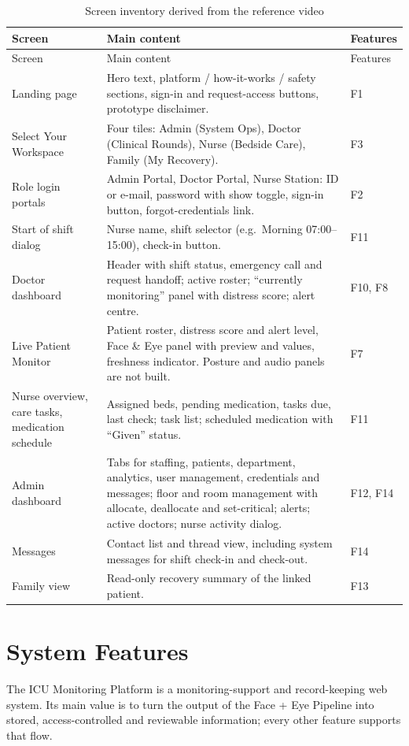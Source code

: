 \documentclass[a4paper,11pt]{scrreprt}
\begin{document}
\begin{longtable}{@{}>{\raggedright\arraybackslash}p{4.3cm}>{\raggedright\arraybackslash}p{8.2cm}>{\raggedright\arraybackslash}p{2.5cm}@{}}
\caption{Screen inventory derived from the reference video}\label{tab:screens}\\
\toprule Screen & Main content & Features\\ \midrule \endfirsthead
\toprule Screen & Main content & Features\\ \midrule \endhead
\bottomrule \endfoot
Landing page & Hero text, platform / how-it-works / safety sections, sign-in and request-access buttons, prototype disclaimer. & F1\\ \midrule
Select Your Workspace & Four tiles: Admin (System Ops), Doctor (Clinical Rounds), Nurse (Bedside Care), Family (My Recovery). & F3\\ \midrule
Role login portals & Admin Portal, Doctor Portal, Nurse Station: ID or e-mail, password with show toggle, sign-in button, forgot-credentials link. & F2\\ \midrule
Start of shift dialog & Nurse name, shift selector (e.g.\ Morning 07:00--15:00), check-in button. & F11\\ \midrule
Doctor dashboard & Header with shift status, emergency call and request handoff; active roster; ``currently monitoring'' panel with distress score; alert centre. & F10, F8\\ \midrule
Live Patient Monitor & Patient roster, distress score and alert level, Face \& Eye panel with preview and values, freshness indicator. Posture and audio panels are not built. & F7\\ \midrule
Nurse overview, care tasks, medication schedule & Assigned beds, pending medication, tasks due, last check; task list; scheduled medication with ``Given'' status. & F11\\ \midrule
Admin dashboard & Tabs for staffing, patients, department, analytics, user management, credentials and messages; floor and room management with allocate, deallocate and set-critical; alerts; active doctors; nurse activity dialog. & F12, F14\\ \midrule
Messages & Contact list and thread view, including system messages for shift check-in and check-out. & F14\\ \midrule
Family view & Read-only recovery summary of the linked patient. & F13\\
\end{longtable}

\chapter{System Features}
The ICU Monitoring Platform is a monitoring-support and record-keeping web system. Its main value is to turn the output of the Face + Eye Pipeline into stored, access-controlled and reviewable information; every other feature supports that flow.
\end{document}
